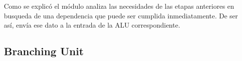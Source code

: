 \documentclass[12pt]{article}
\begin{document}
\noindent Como se explicó el módulo analiza las necesidades de las etapas anteriores en busqueda de una dependencia que puede ser cumplida inmediatamente. De ser así, envía ese dato a la entrada de la ALU correspondiente.

\subsection{Branching Unit}





\end{document}
